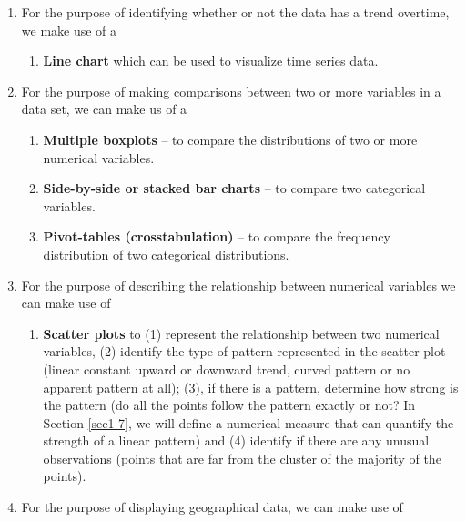 \documentclass[
]{book}
\providecommand{\tightlist}{%
  \setlength{\itemsep}{0pt}\setlength{\parskip}{0pt}}
\begin{document}
\begin{enumerate}
\def\labelenumi{\arabic{enumi}.}
\setcounter{enumi}{1}
\item
  For the purpose of identifying whether or not the data has a trend overtime, we make use of a

  \begin{enumerate}
  \def\labelenumii{\alph{enumii}.}
  \tightlist
  \item
    \textbf{Line chart} which can be used to visualize time series data.
  \end{enumerate}
\item
  For the purpose of making comparisons between two or more variables in a data set, we can make us of a

  \begin{enumerate}
  \def\labelenumii{\alph{enumii}.}
  \item
    \textbf{Multiple boxplots} -- to compare the distributions of two or more numerical variables.
  \item
    \textbf{Side-by-side or stacked bar charts} -- to compare two categorical variables.
  \item
    \textbf{Pivot-tables (crosstabulation)} -- to compare the frequency distribution of two categorical distributions.
  \end{enumerate}
\item
  For the purpose of describing the relationship between numerical variables we can make use of

  \begin{enumerate}
  \def\labelenumii{\alph{enumii}.}
  \tightlist
  \item
    \textbf{Scatter plots} to (1) represent the relationship between two numerical variables, (2) identify the type of pattern represented in the scatter plot (linear constant upward or downward trend, curved pattern or no apparent pattern at all); (3), if there is a pattern, determine how strong is the pattern (do all the points follow the pattern exactly or not? In Section \ref{sec1-7}, we will define a numerical measure that can quantify the strength of a linear pattern) and (4) identify if there are any unusual observations (points that are far from the cluster of the majority of the points).
  \end{enumerate}
\item
  For the purpose of displaying geographical data, we can make use of


\end{enumerate}
\end{document}
